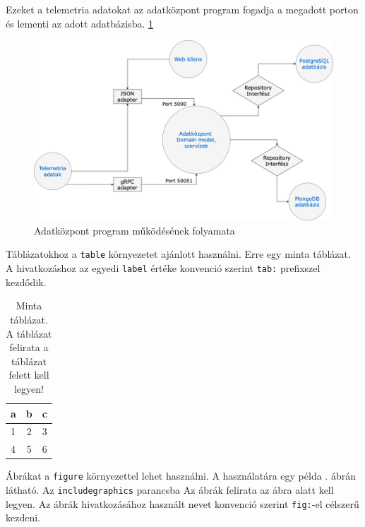 Ezeket a telemetria adatokat az adatközpont program fogadja a megadott porton és lementi az adott adatbázisba. \ref{fig:adatkozpont-flow}

\begin{figure}[h]
    \centering
    \includegraphics[scale=0.3]{images/adatkozpont-flow.png}
    \caption{Adatközpont program működésének folyamata}
    \label{fig:adatkozpont-flow}
\end{figure}



Táblázatokhoz a \texttt{table} környezetet ajánlott használni.
Erre egy minta  táblázat.
A hivatkozáshoz az egyedi \texttt{label} értéke konvenció szerint \texttt{tab:} prefixszel kezdődik.

\begin{table}[h]
\centering
\caption{Minta táblázat. A táblázat felirata a táblázat felett kell legyen!}
\label{tab:minta}
\begin{tabular}{l|c|c|}
a & b & c \\
\hline
1 & 2 & 3 \\
4 & 5 & 6 \\
\hline
\end{tabular}
\end{table}


Ábrákat a \texttt{figure} környezettel lehet használni.
A használatára egy példa . ábrán látható.
Az \texttt{includegraphics} parancsba 
Az ábrák felirata az ábra alatt kell legyen.
Az ábrák hivatkozásához használt nevet konvenció szerint \texttt{fig:}-el célszerű kezdeni.

